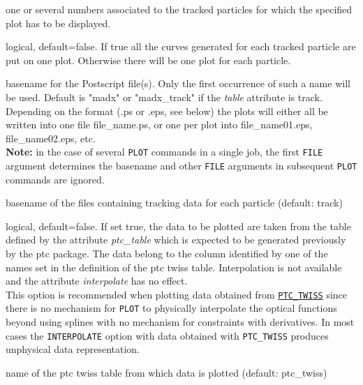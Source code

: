 \begin{madlist}
    one or several numbers associated to the tracked
     particles for which the specified plot has to be displayed.  

    logical, default=false. If true all the curves
     generated for each tracked particle are put on one plot. Otherwise
     there will be one plot for each particle.   

    basename for the Postscript
     file(s). Only the first occurrence of such a name will be
     used. Default is "madx" or "madx\_track" if the \textit{table}
     attribute is track.  Depending on the format (.ps or .eps, see
     below) the plots will either all be written into one file
     file\_name.ps, or one per plot into file\_name01.eps,
     file\_name02.eps, etc. \\
     \textbf{Note:} in the case of several \texttt{PLOT} commands in a
     single \madx job, the first \texttt{FILE} argument determines the
     basename and other \texttt{FILE} arguments in subsequent
     \texttt{PLOT} commands are ignored.  

    basename of the files containing
     tracking data for each particle (default: track)  

    logical, default=false. If set true, the data to be
     plotted are taken from the table defined by the attribute
     \textit{ptc\_table} which is expected to be generated previously by
     the ptc package. The data belong to the column identified by one of
     the names set in the definition of the ptc twiss
     table. Interpolation is not available and the attribute
     \textit{interpolate} has no effect. \\ 
     This option is recommended when plotting data
     obtained from \hyperref[chap:ptc-twiss]{\texttt{PTC\_TWISS}} since
     there is no mechanism for \texttt{PLOT} to physically interpolate
     the optical functions beyond using splines with no mechanism for
     constraints with derivatives. In most cases the
     \texttt{INTERPOLATE} option with data obtained with
     \texttt{PTC\_TWISS} produces unphysical data representation. 

    name of the ptc twiss table from which data is
     plotted (default: ptc\_twiss)

\end{madlist}



